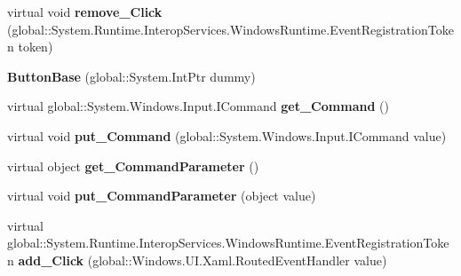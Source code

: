\begin{DoxyCompactItemize}
virtual void {\bfseries remove\+\_\+\+Click} (global\+::\+System.\+Runtime.\+Interop\+Services.\+Windows\+Runtime.\+Event\+Registration\+Token token)
\item 
\mbox{\label{class_windows_1_1_u_i_1_1_xaml_1_1_controls_1_1_primitives_1_1_button_base_a851f5f68708d5a8ca328fd2bb6c9e52f}} 
{\bfseries Button\+Base} (global\+::\+System.\+Int\+Ptr dummy)
\item 
\mbox{\label{class_windows_1_1_u_i_1_1_xaml_1_1_controls_1_1_primitives_1_1_button_base_a828bb580c4aeeb639426f27ce0b6c586}} 
virtual global\+::\+System.\+Windows.\+Input.\+I\+Command {\bfseries get\+\_\+\+Command} ()
\item 
\mbox{\label{class_windows_1_1_u_i_1_1_xaml_1_1_controls_1_1_primitives_1_1_button_base_a27ec61fd5abbda5b2d691374503645fc}} 
virtual void {\bfseries put\+\_\+\+Command} (global\+::\+System.\+Windows.\+Input.\+I\+Command value)
\item 
\mbox{\label{class_windows_1_1_u_i_1_1_xaml_1_1_controls_1_1_primitives_1_1_button_base_a71053af3b8056232052cbff4a66ff6f1}} 
virtual object {\bfseries get\+\_\+\+Command\+Parameter} ()
\item 
\mbox{\label{class_windows_1_1_u_i_1_1_xaml_1_1_controls_1_1_primitives_1_1_button_base_a86576fdbbfa333daaeb36e8f5a364daa}} 
virtual void {\bfseries put\+\_\+\+Command\+Parameter} (object value)
\item 
\mbox{\label{class_windows_1_1_u_i_1_1_xaml_1_1_controls_1_1_primitives_1_1_button_base_a31798116cfe3b23bc8cca409f8286eb8}} 
virtual global\+::\+System.\+Runtime.\+Interop\+Services.\+Windows\+Runtime.\+Event\+Registration\+Token {\bfseries add\+\_\+\+Click} (global\+::\+Windows.\+U\+I.\+Xaml.\+Routed\+Event\+Handler value)
\item 
\mbox{\label{class_windows_1_1_u_i_1_1_xaml_1_1_controls_1_1_primitives_1_1_button_base_ab98c10641e50dd837e7182b45444a6cb}} 

\end{DoxyCompactItemize}
